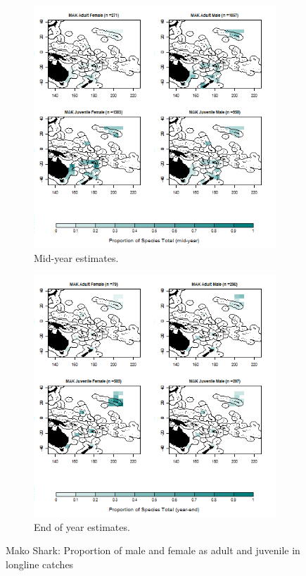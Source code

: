 \documentclass[12pt]{SCreport}
\begin{document}
\begin{landscape}
\begin{figure}
\centering
   \begin{subfigure}[b]{0.6\textwidth}
       \includegraphics[width=\textwidth]{../GRAPHICS/Map_maturity_sex_MAK_MY}
       \caption{Mid-year estimates.}
       \label{fig:test1}
   \end{subfigure}
   \begin{subfigure}[b]{0.6\textwidth}
       \includegraphics[width=\textwidth]{../GRAPHICS/Map_maturity_sex_MAK}
       \caption{End of year estimates.}
       \label{fig:test2}
   \end{subfigure}
\caption{Mako Shark: Proportion of male and female as adult and juvenile in longline catches }
\label{fig:test} 
\end{figure}
\end{landscape}
\end{document}
